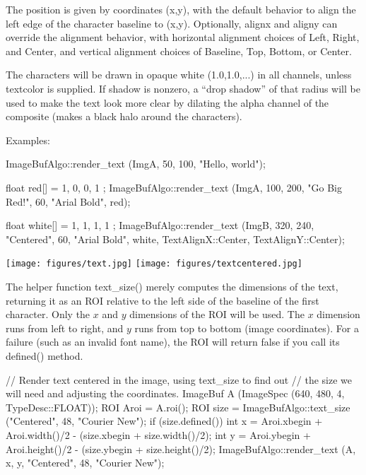 The position is given by coordinates ({\cf x,y}), with the default behavior
to align the left edge of the character baseline to ({\cf x,y}). Optionally,
{\cf alignx} and {\cf aligny} can override the alignment behavior, with horizontal
alignment choices of {\cf Left}, {\cf Right}, and {\cf Center}, and vertical alignment
choices of {\cf Baseline}, {\cf Top}, {\cf Bottom}, or {\cf Center}.

The characters will be drawn in opaque white (1.0,1.0,...) in all channels,
unless {\cf textcolor} is supplied. If {\cf shadow} is nonzero, a ``drop shadow'' of
that radius will be used to make the text look more clear by dilating the
alpha channel of the composite (makes a black halo around the characters).

\smallskip
\noindent Examples:
\begin{code}
    ImageBufAlgo::render_text (ImgA, 50, 100, "Hello, world");

    float red[] = { 1, 0, 0, 1 };
    ImageBufAlgo::render_text (ImgA, 100, 200, "Go Big Red!",
                               60, "Arial Bold", red);

    float white[] = { 1, 1, 1, 1 };
    ImageBufAlgo::render_text (ImgB, 320, 240, "Centered",
                               60, "Arial Bold", white,
                               TextAlignX::Center, TextAlignY::Center);

\end{code}
\spc \texttt{[image: figures/text.jpg]}
\spc \texttt{[image: figures/textcentered.jpg]} \\
\apiend


 

The helper function {\cf text_size()} merely computes the dimensions of the
text, returning it as an {\cf ROI}  relative to the left side of the
baseline of the first character. Only the $x$ and $y$ dimensions of the ROI
will be used. The $x$ dimension runs from left to right, and $y$ runs from
top to bottom (image coordinates). For a failure (such as an invalid
font name), the ROI will return {\cf false} if you call its {\cf defined()}
method.

\begin{code}
    // Render text centered in the image, using text_size to find out
    // the size we will need and adjusting the coordinates.
    ImageBuf A (ImageSpec (640, 480, 4, TypeDesc::FLOAT));
    ROI Aroi = A.roi();
    ROI size = ImageBufAlgo::text_size ("Centered", 48, "Courier New");
    if (size.defined()) {
        int x = Aroi.xbegin + Aroi.width()/2  - (size.xbegin + size.width()/2);
        int y = Aroi.ybegin + Aroi.height()/2 - (size.ybegin + size.height()/2);
        ImageBufAlgo::render_text (A, x, y, "Centered", 48, "Courier New");
    }
\end{code}
\apiend



